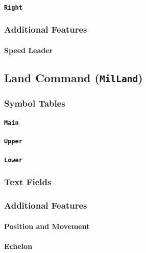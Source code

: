 \documentclass[a4paper, titlepage]{article}
\begin{document}
\paragraph{\texttt{Right}}

\subsubsection{Additional Features}

\paragraph{Speed Leader}

\subsection{Land Command (\textbf{\texttt{MilLand}})}

\subsubsection{Symbol Tables}

\paragraph{\texttt{Main}}

\paragraph{\texttt{Upper}}

\paragraph{\texttt{Lower}}

\subsubsection{Text Fields}

\subsubsection{Additional Features}

\paragraph{Position and Movement}

\paragraph{Echelon}
\end{document}
